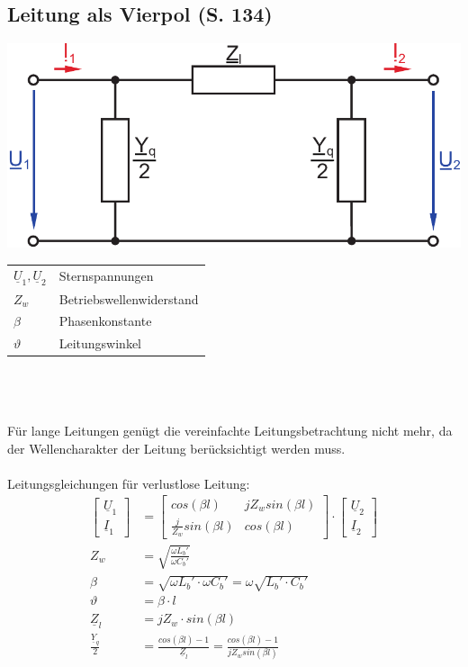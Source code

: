 \documentclass[a4paper,twocolumn,10pt]{article}
\begin{document}
\subsection{Leitung als Vierpol (S. 134)}
\begin{center}
\includegraphics[width=0.8\columnwidth]{Grafiken/Vierpolleitung}
\end{center}
\begin{tabular}{ll}
$\underline{U}_1,\underline{U}_2$ & Sternspannungen\\
$Z_w$ & Betriebswellenwiderstand\\
$\beta$ & Phasenkonstante\\
$\vartheta$ & Leitungswinkel
\end{tabular}\\\\\\
Für lange Leitungen genügt die vereinfachte Leitungsbetrachtung nicht mehr, da der Wellencharakter der Leitung berücksichtigt werden muss.\\\\
Leitungsgleichungen für verlustlose Leitung:
\begin{equation*}
\begin{split}
\begin{bmatrix}\underline{U}_1 \\ \underline{I}_1\end{bmatrix}&=\begin{bmatrix}cos(\beta l) & jZ_wsin(\beta l) \\ \frac{j}{Z_w}sin(\beta l) & cos(\beta l)\end{bmatrix}\cdot\begin{bmatrix}\underline{U}_2 \\ \underline{I}_2\end{bmatrix}\\
Z_w&=\sqrt{\frac{\omega L_b'}{\omega C_b'}}\\
\beta&=\sqrt{\omega L_b'\cdot \omega C_b'}=\omega\sqrt{L_b'\cdot C_b'}\\
\vartheta&=\beta\cdot l\\
\underline{Z}_l&=jZ_w\cdot sin(\beta l)\\
\frac{\underline{Y}_q}{2}&=\frac{cos(\beta l)-1}{\underline{Z}_l}=\frac{cos(\beta l)-1}{jZ_w sin(\beta l)}
\end{split}
\end{equation*}
\end{document}
